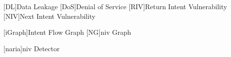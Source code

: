 \newcommand{\intentargs}{15,592} %
\newcommand{\uriargs}{2,274} %
\newcommand{\pendingintentargs}{665} %
\newcommand{\createChooser}{528} %
\newcommand{\getLaunchIntent}{80} %
\newcommand{\getIntent}{32} %
\newcommand{\setattrinvoke}{52,669} %

\newcommand{\reusediccobj}{1,379} %
\newcommand{\extrafromintent}{566} %
\newcommand{\objsinui}{1,156} %
\newcommand{\objsindb}{136}
\newcommand{\objsinlog}{138}
\newcommand{\objsinweb}{22}
\newcommand{\objsinview}{1,072}

\newcommand{\controllingicc}{18,679} %
\newcommand{\controllingloop}{1,276} %
\newcommand{\controlledicc}{55,046} %
\newcommand{\controlledbyloop}{3,151} %
\newcommand{\icccontrolicc}{7,301} %
\newcommand{\maxnestloop}{4} %
\newcommand{\controllingiccapps}{287} %
\newcommand{\controllediccapps}{295} %
\newcommand{\controllingretapi}{11,695 (62.6\%)} %
\newcommand{\avgcontrolledlines}{550} %
\newcommand{\maxcontrolledlines}{10,698} %
\newcommand{\extraactionnullcheckpec}{984 (33.1\%)} %
\newcommand{\extracontrollingtimes}{2,976} %
\newcommand{\actioncontrollingtimes}{2,537} %
\newcommand{\querycontrollinglooptimes}{\placeholder} %
\newcommand{\controlledconstrucingicc}{30,217} %
\newcommand{\plusonecontrolledconstructing}{19,319 (63.9\%)} %
\newcommand{\controlledactivitingicc}{9,365} %
\newcommand{\plusonecontrolledactivting}{5,512 (58.9\%)} %
\newcommand{\retrieveicccontrollui}{942} %
\newcommand{\reticccontrolacticc}{1,065} %
\newcommand{\reticccontrolconstructicc}{5,260} %
\newcommand{\loopusingintent}{333}

[DL]{Data Leakage}
[DoS]{Denial of Service}
[RIV]{Return Intent Vulnerability}
[NIV]{Next Intent Vulnerability}

[iGraph]{Intent Flow Graph}
[NG]{\ac{niv} Graph}

[n\ac{aria}]{\ac{niv} Detector}